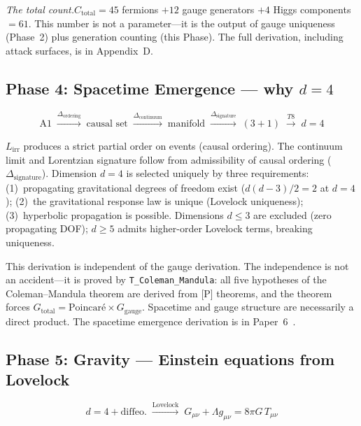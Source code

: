 \documentclass[11pt]{article}
\begin{document}
\textit{The total count.}\quad $C_{\mathrm{total}} = 45$ fermions $+ 12$ gauge generators $+ 4$ Higgs components $= 61$.  This number is not a parameter---it is the output of gauge uniqueness (Phase~2) plus generation counting (this Phase).  The full derivation, including attack surfaces, is in Appendix~D.


\subsection{Phase 4: Spacetime Emergence --- why \texorpdfstring{$d=4$}{d=4}}

\begin{equation}
\text{A1} \;\xrightarrow{\Delta_{\mathrm{ordering}}}\; \text{causal set} \;\xrightarrow{\Delta_{\mathrm{continuum}}}\; \text{manifold} \;\xrightarrow{\Delta_{\mathrm{signature}}}\; (3{+}1) \;\xrightarrow{T8}\; d=4
\end{equation}

$L_{\mathrm{irr}}$ produces a strict partial order on events (causal ordering).  The continuum limit and Lorentzian signature follow from admissibility of causal ordering ($\Delta_{\mathrm{signature}}$).  Dimension $d=4$ is selected uniquely by three requirements: (1)~propagating gravitational degrees of freedom exist ($d(d-3)/2 = 2$ at $d=4$); (2)~the gravitational response law is unique (Lovelock uniqueness); (3)~hyperbolic propagation is possible.  Dimensions $d \le 3$ are excluded (zero propagating DOF); $d \ge 5$ admits higher-order Lovelock terms, breaking uniqueness.

This derivation is independent of the gauge derivation.  The independence is not an accident---it is proved by \texttt{T\_Coleman\_Mandula}: all five hypotheses of the Coleman--Mandula theorem are derived from [P] theorems, and the theorem forces $G_{\mathrm{total}} = \text{Poincar\'e} \times G_{\mathrm{gauge}}$.  Spacetime and gauge structure are necessarily a direct product.  The spacetime emergence derivation is in Paper~6~\cite{P6}.


\subsection{Phase 5: Gravity --- Einstein equations from Lovelock}

\begin{equation}
d = 4 + \text{diffeo.} \;\xrightarrow{\text{Lovelock}}\; G_{\mu\nu} + \Lambda g_{\mu\nu} = 8\pi G\, T_{\mu\nu}
\end{equation}
\end{document}

